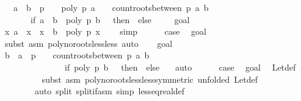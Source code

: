 \begin{isabellebody}
\ \ \ {\isacharparenleft}a\ {\isasymge}\ b\ {\isasymor}\ p\ {\isasymnoteq}\ {}\ {\isasymand}\ poly\ p\ a\ {\isasymnoteq}\ {}\ {\isasymand}\ count{\isacharunderscore}roots{\isacharunderscore}between\ p\ a\ b\ {\isacharequal}\ \isanewline
\ \ \ \ \ \ \ {\isacharparenleft}if\ a\ {\isacharless}\ b\ {\isasymand}\ poly\ p\ b\ {\isacharequal}\ {}\ then\ {}\ else\ {}{\isacharparenright}{\isacharparenright}{\isacharparenright}{\isachardoublequoteclose}\isanewline
%
\isadelimproof
%
\endisadelimproof
%
\isatagproof
{}\isamarkupfalse%
\isanewline
\ \ \isamarkupfalse%
\ goal{}\isanewline
\ \ \ \ \isamarkupfalse%
\ {\isachardoublequoteopen}{\isasymforall}x{\isachardot}\ a\ {\isacharless}\ x\ {\isasymand}\ x\ {\isacharless}\ b\ {\isasymlongrightarrow}\ poly\ p\ x\ {\isasymnoteq}\ {}{\isachardoublequoteclose}\ \isamarkupfalse%
\ simp\isanewline
\ \ \ \ \isamarkupfalse%
\ {\isacharquery}case\ \isamarkupfalse%
\ goal{}\ \isamarkupfalse%
\ {\isacharparenleft}subst\ {\isacharparenleft}asm{\isacharparenright}\ poly{\isacharunderscore}no{\isacharunderscore}roots{\isacharunderscore}less{\isacharunderscore}less{\isacharcomma}\ auto{\isacharparenright}\isanewline
{}\isamarkupfalse%
\isanewline
\ \ \isamarkupfalse%
\ goal{}\isanewline
\ \ \ \ \isamarkupfalse%
\ {\isachardoublequoteopen}{\isacharparenleft}b\ {\isasymle}\ a\ {\isasymor}\ p\ {\isasymnoteq}\ {}\ {\isasymand}\ count{\isacharunderscore}roots{\isacharunderscore}between\ p\ a\ b\ {\isacharequal}\ \isanewline
\ \ \ \ \ \ \ \ \ \ \ \ \ \ \ {\isacharparenleft}if\ poly\ p\ b\ {\isacharequal}\ {}\ then\ {}\ else\ {}{\isacharparenright}{\isacharparenright}{\isachardoublequoteclose}\ \isamarkupfalse%
\ auto\isanewline
\ \ \ \ \isamarkupfalse%
\ {\isacharquery}case\ \isamarkupfalse%
\ goal{}\ \isamarkupfalse%
\ Let{\isacharunderscore}def\isanewline
\ \ \ \ \ \ \ \ \isamarkupfalse%
\ {\isacharparenleft}subst\ {\isacharparenleft}asm{\isacharparenright}\ poly{\isacharunderscore}no{\isacharunderscore}roots{\isacharunderscore}less{\isacharunderscore}less{\isacharbrackleft}symmetric{\isacharcomma}\ unfolded\ Let{\isacharunderscore}def{\isacharbrackright}{\isacharcomma}\ \isanewline
\ \ \ \ \ \ \ \ auto\ split{\isacharcolon}\ split{\isacharunderscore}if{\isacharunderscore}asm\ simp{\isacharcolon}\ less{\isacharunderscore}eq{\isacharunderscore}real{\isacharunderscore}def{\isacharparenright}\ \isanewline

\end{isabellebody}
